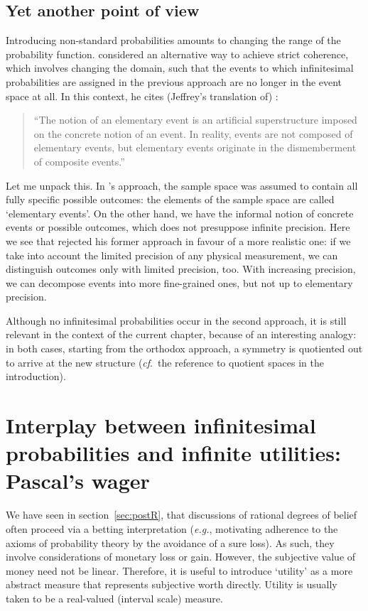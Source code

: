 \subsection{Yet another point of view}
Introducing non-standard probabilities amounts to changing the range of the probability function. \citet{Skyrms:1995} considered an alternative way to achieve strict coherence, which involves changing the domain, such that the events to which infinitesimal probabilities are assigned in the previous approach are no longer in the event space at all.
In this context, he cites (Jeffrey's translation of) \citet{Kolmogorov:1948}:
\begin{quote}
``The notion of an elementary event is an artificial superstructure imposed on the concrete notion of an event. In reality, events are not composed of elementary events, but elementary events originate in the dismemberment of composite events.''
\end{quote}
Let me unpack this. In \citet{Kolmogorov:1933}'s approach, the sample space was assumed to contain all fully specific possible outcomes: the elements of the sample space are called `elementary events'. On the other hand, we have the informal notion of concrete events or possible outcomes, which does not presuppose infinite precision. Here we see that \citet{Kolmogorov:1948} rejected his former approach in favour of a more realistic one: if we take into account the limited precision of any physical measurement, we can distinguish outcomes only with limited precision, too. With increasing precision, we can decompose events into more fine-grained ones, but not up to elementary precision.

Although no infinitesimal probabilities occur in the second approach, it is still relevant in the context of the current chapter, because of an interesting analogy: in both cases, starting from the orthodox approach, a symmetry is quotiented out to arrive at the new structure (\textit{cf}.\ the reference to quotient spaces in the introduction).

\section{Interplay between infinitesimal probabilities and infinite utilities: Pascal's wager}\label{sec:pascalswager}
We have seen in section~\ref{sec:postR}, that discussions of rational degrees of belief often proceed via a betting interpretation (\textit{e.g.}, motivating adherence to the axioms of probability theory by the avoidance of a sure loss). As such, they involve considerations of monetary loss or gain. However, the subjective value of money need not be linear. Therefore, it is useful to introduce `utility' as a more abstract measure that represents subjective worth directly. Utility is usually taken to be a real-valued (interval scale) measure.

